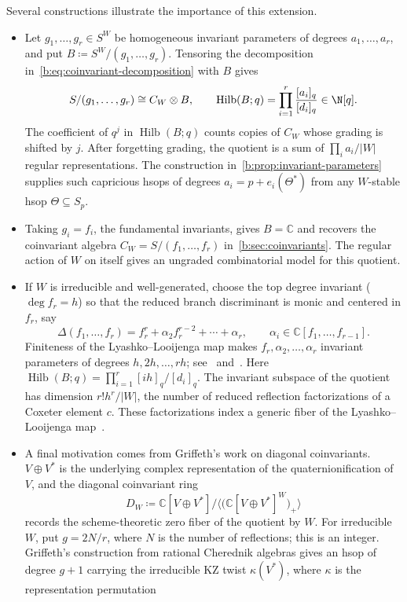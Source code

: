 \documentclass[11pt]{amsart}
\newcommand{\defeq}{\coloneqq}
\theoremstyle{definition}
\newcommand{\C}{\mathbb C}\newcommand{\Q}{\mathbb Q}
\DeclareMathOperator{\Hilb}{Hilb}\DeclareMathOperator{\Res}{Res}
\begin{document}
Several constructions illustrate the importance of this extension.
\begin{itemize}
\item Let $g_1,\ldots,g_r\in S^W$ be homogeneous invariant parameters
of degrees $a_1,\ldots,a_r$, and put
$B\defeq S^W/(g_1,\ldots,g_r)$. Tensoring the decomposition
in~\cref{b:eq:coinvariant-decomposition} with $B$ gives
\[
 S/(g_1,\ldots,g_r)\cong C_W\otimes B,\qquad
 \Hilb(B;q)=\prod_{i=1}^r\frac{[a_i]_q}{[d_i]_q}\in\N[q].
\]
The coefficient of $q^j$ in $\Hilb(B;q)$ counts copies of $C_W$
whose grading is shifted by $j$. After forgetting grading, the
quotient is a sum of $\prod_i a_i/|W|$ regular representations.
The construction in~\cref{b:prop:invariant-parameters} supplies such
capricious hsops of degrees $a_i=p+e_i(\Theta^*)$ from any
$W$-stable hsop $\Theta\subseteq S_p$.
\item Taking $g_i=f_i$, the fundamental invariants, gives $B=\C$
and recovers the coinvariant algebra $C_W=S/(f_1,\ldots,f_r)$
in~\cref{b:sec:coinvariants}. The regular action of $W$ on itself
gives an ungraded combinatorial model for this quotient.
\item If $W$ is irreducible and well-generated, choose the top degree
invariant ($\deg f_r=h$) so that the reduced branch discriminant
is monic and centered in $f_r$, say
\[
 \Delta(f_1,\ldots,f_r)
 =f_r^r+\alpha_2f_r^{r-2}+\cdots+\alpha_r,
 \qquad \alpha_i\in\C[f_1,\ldots,f_{r-1}].
\]
Finiteness of the Lyashko--Looijenga map makes
$f_r,\alpha_2,\ldots,\alpha_r$ invariant parameters of degrees
$h,2h,\ldots,rh$; see~\cite[Section~7.2]{EquivariantParameters}
and~\cite[Lemma~4.4]{DouvropoulosLL}.
Here $\Hilb(B;q)=\prod_{i=1}^r[ih]_q/[d_i]_q$.
The invariant subspace of the quotient has dimension $r!h^r/|W|$,
the number of reduced reflection factorizations of a Coxeter element $c$.
These factorizations index a generic fiber of the Lyashko--Looijenga
map~\cite[Theorem~7.20]{Bessis}.
\item A final motivation comes from Griffeth's work on diagonal coinvariants.
$V\oplus V^*$ is the underlying complex representation of the
quaternionification of $V$, and the diagonal coinvariant ring
\[
 D_W\defeq\C[V\oplus V^*]\big/
 \big\langle\bigl(\C[V\oplus V^*]^W\bigr)_+\big\rangle
\]
records the scheme-theoretic zero fiber of the quotient by $W$.
For irreducible $W$, put $g=2N/r$, where $N$ is the number of reflections;
this is an integer. Griffeth's construction from rational Cherednik
algebras gives an hsop of degree $g+1$ carrying the irreducible
KZ twist $\kappa(V^*)$, where $\kappa$ is the representation permutation

\end{itemize}
\end{document}
